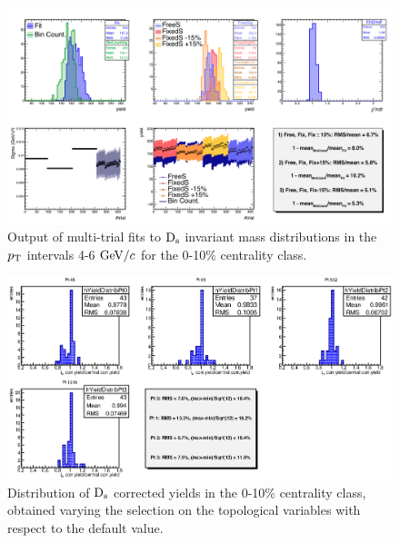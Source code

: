 \begin{figure}[!htb]
 \begin{center}
\includegraphics[width=15.cm]{./FigCap5/MT_Pt46_010.png}
\end{center}
 \caption{Output of multi-trial fits to ${\rm D_s}$ invariant mass distributions in the $p_{\rm T}$ intervals 4-6 $\mathrm{GeV}/c$  for the 0-10$\%$ centrality class.}
 \label{fig:multitrial_Ds_010}
\end{figure}


\begin{figure}[!h]
 \begin{center}
   \includegraphics[angle=0, width=15cm]{./FigCap5/FinalSyst_010.eps}
 \end{center}
 \caption{Distribution of ${\rm D_s}$ corrected yields in the 0-10\% centrality class, obtained varying the selection on the topological variables with respect to the default value.}
 \label{DsCutVar_010} 
\end{figure}

